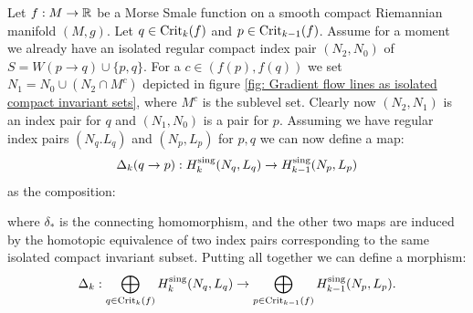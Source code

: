 \begin{example}
     Let $f:M\to \mathbb{R}$ be a Morse Smale function on a smooth compact Riemannian manifold $(M,g)$. Let $q\in \mathrm{Crit}_k(f)$ and $p\in \mathrm{Crit}_{k-1}(f)$. Assume for a moment we already have an isolated regular compact index pair $(N_2,N_0)$ of $S=W(p\to q)\cup\{p,q\}$. 
     For a $c\in (f(p),f(q))$ we set $N_1=N_0\cup (N_2 \cap M^c)$ depicted in figure \ref{fig: Gradient flow lines as isolated compact invariant sets}, where $M^c$ is the sublevel set. Clearly now $(N_2,N_1)$ is an index pair for $q$ and $(N_1,N_0)$ is a pair for $p$. Assuming we have regular index pairs $(N_q.L_q)$ and $(N_p,L_p)$ for $p,q$ we can now define a map:
     \begin{align*}
         \Delta_k(q \to p): H^{\mathrm{sing}}_k(N_q,L_q) \to H^{\mathrm{sing}}_{k-1}(N_p,L_p)
     \end{align*} as the composition:
\begin{center}
\end{center} where $\delta_*$ is the connecting homomorphism, and the other two maps are induced by the homotopic equivalence of two index pairs corresponding to the same isolated compact invariant subset. Putting all together we can define a morphism:
\begin{align}\label{equation: definition of boundary operator for filtrations}
    \Delta_k:\bigoplus_{q\in \mathrm{Crit}_k(f)}H^{\mathrm{sing}}_k(N_q,L_q)\to \bigoplus_{p\in \mathrm{Crit}_{k-1}(f)}H^{\mathrm{sing}}_{k-1}(N_p,L_p).
\end{align}
\end{example}

